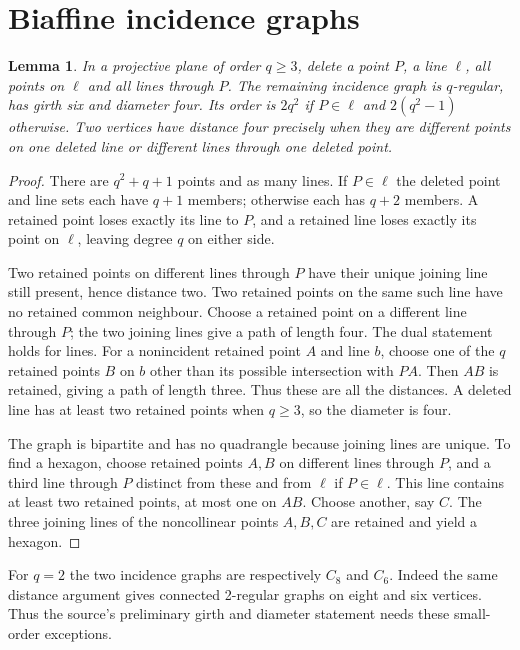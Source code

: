 \documentclass[11pt,a4paper]{article}
\newtheorem{lemma}[theorem]{Lemma}
\begin{document}
\section{Biaffine incidence graphs}

\begin{lemma}\label{lem:planes}
In a projective plane of order $q\geq3$, delete a point $P$, a line
$\ell$, all points on $\ell$ and all lines through $P$. The remaining
incidence graph is $q$-regular, has girth six and diameter four.
Its order is $2q^2$ if $P\in\ell$ and $2(q^2-1)$ otherwise.
Two vertices have distance four precisely when they are different
points on one deleted line or different lines through one deleted point.
\end{lemma}
\begin{proof}
There are $q^2+q+1$ points and as many lines. If $P\in\ell$ the
deleted point and line sets each have $q+1$ members; otherwise each
has $q+2$ members. A retained point loses exactly its line to $P$,
and a retained line loses exactly its point on $\ell$, leaving
degree $q$ on either side.

Two retained points on different lines through $P$ have their unique
joining line still present, hence distance two. Two retained points
on the same such line have no retained common neighbour. Choose
a retained point on a different line through $P$; the two joining
lines give a path of length four. The dual statement holds for lines.
For a nonincident retained point $A$ and line $b$, choose one of the
$q$ retained points $B$ on $b$ other than its possible intersection
with $PA$. Then $AB$ is retained, giving a path of length three.
Thus these are all the distances. A deleted line has at least two
retained points when $q\geq3$, so the diameter is four.

The graph is bipartite and has no quadrangle because joining lines
are unique. To find a hexagon, choose retained points $A,B$ on
different lines through $P$, and a third line through $P$ distinct
from these and from $\ell$ if $P\in\ell$. This line contains at
least two retained points, at most one on $AB$. Choose another,
say $C$. The three joining lines of the noncollinear points $A,B,C$
are retained and yield a hexagon.
\end{proof}

For $q=2$ the two incidence graphs are respectively $C_8$ and $C_6$.
Indeed the same distance argument gives connected 2-regular graphs
on eight and six vertices. Thus the source's preliminary girth and
diameter statement needs these small-order exceptions.
\end{document}
